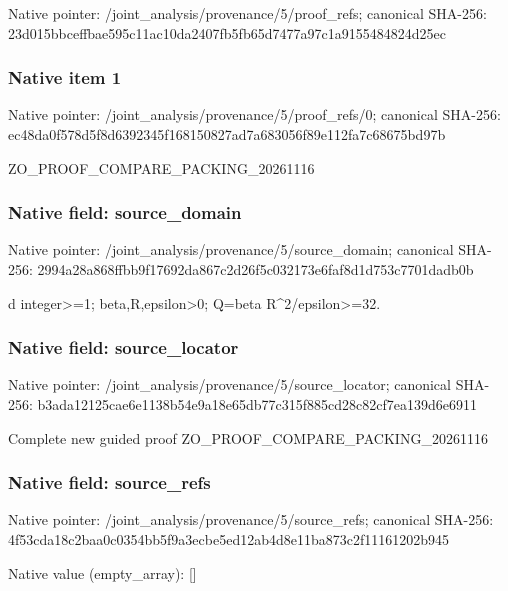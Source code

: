 \documentclass[10pt,a4paper]{article}
\begin{document}
Native pointer: /joint\_analysis/provenance/5/proof\_refs; canonical SHA-256: 23d015bbceffbae595c11ac1\allowbreak{}0da2407fb5fb65d7477a97c1\allowbreak{}a9155484824d25ec



\subsubsection{Native item 1}


Native pointer: /joint\_analysis/provenan\allowbreak{}ce/5/proof\_refs/0; canonical SHA-256: ec48da0f578d5f8d6392345f\allowbreak{}168150827ad7a683056f89e1\allowbreak{}12fa7c68675bd97b


ZO\_PROOF\_COMPARE\_PACKING\_20261116


\subsubsection{Native field: source\_domain}


Native pointer: /joint\_analysis/provenan\allowbreak{}ce/5/source\_domain; canonical SHA-256: 2994a28a868ffbb9f17692da\allowbreak{}867c2d26f5c032173e6faf8d\allowbreak{}1d753c7701dadb0b


d integer>=1; beta,R,epsilon>0; Q=beta R\textasciicircum{}2/epsilon>=32.


\subsubsection{Native field: source\_locator}


Native pointer: /joint\_analysis/provenan\allowbreak{}ce/5/source\_locator; canonical SHA-256: b3ada12125cae6e1138b54e9\allowbreak{}a18e65db77c315f885cd28c8\allowbreak{}2cf7ea139d6e6911


Complete new guided proof ZO\_PROOF\_COMPARE\_PACKING\_20261116


\subsubsection{Native field: source\_refs}


Native pointer: /joint\_analysis/provenan\allowbreak{}ce/5/source\_refs; canonical SHA-256: 4f53cda18c2baa0c0354bb5f\allowbreak{}9a3ecbe5ed12ab4d8e11ba87\allowbreak{}3c2f11161202b945



Native value (empty\_array): []
\end{document}
